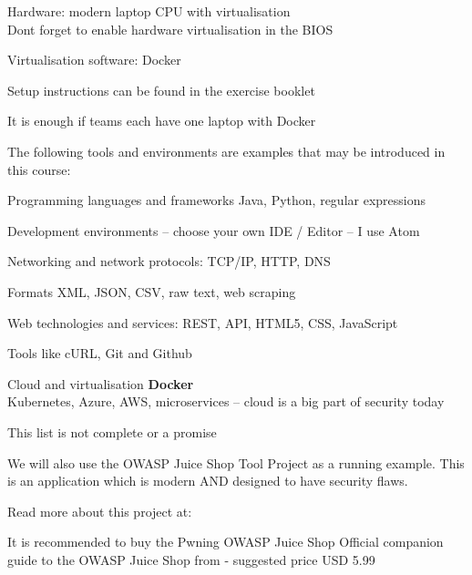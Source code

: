 \documentclass[Screen16to9,17pt]{foils}
\begin{document}


\begin{list2}
\item Hardware: modern laptop CPU with virtualisation\\
Dont forget to enable hardware virtualisation in the BIOS
\item Virtualisation software: Docker
\item Setup instructions can be found in the exercise booklet
\end{list2}

\centerline{It is enough if teams each have one laptop with Docker}



The following tools and environments are examples that may be introduced in this course:

\begin{list2}
\item Programming languages and frameworks Java, Python, regular expressions
\item Development environments -- choose your own IDE / Editor -- I use Atom
\item Networking and network protocols: TCP/IP, HTTP, DNS
\item Formats XML, JSON, CSV, raw text, web scraping
\item Web technologies and services: REST, API, HTML5, CSS, JavaScript
\item Tools like cURL, Git and Github
\item Cloud and virtualisation {\bf Docker}\\
Kubernetes, Azure, AWS, microservices -- cloud is a big part of security today
\end{list2}

\centerline{This list is not complete or a promise }



We will also use the OWASP Juice Shop Tool Project as a running example. This is an application which is modern AND designed to have security flaws.

Read more about this project at: \\ 

It is recommended to buy the Pwning OWASP Juice Shop Official companion guide to the OWASP Juice Shop from  - suggested price USD 5.99
\end{document}
